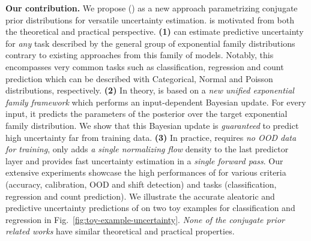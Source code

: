\textbf{Our contribution.} We propose \NatPN{} (\NatPNacro{}) as a new approach parametrizing conjugate prior distributions for versatile uncertainty estimation. \NatPNacro{}{} is motivated from both the theoretical and practical perspective. 
\textbf{(1)} \NatPNacro{} can estimate predictive uncertainty for \emph{any} task described by the general group of exponential family distributions contrary to existing approaches from this family of models. Notably, this encompasses very common tasks such as classification, regression and count prediction which can be described with Categorical, Normal and Poisson distributions, respectively. 
\textbf{(2)} In theory, \NatPNacro{} is based on a \emph{new unified exponential family framework} which performs an input-dependent Bayesian update. For every input, it predicts the parameters of the posterior over the target exponential family distribution. We show that this Bayesian update is \emph{guaranteed} to predict high uncertainty far from training data.
\textbf{(3)} In practice, \NatPNacro{} requires \emph{no OOD data for training}, only adds \emph{a single normalizing flow} density to the last predictor layer and provides fast uncertainty estimation in a \emph{single forward pass}. Our extensive experiments showcase the high performances of \NatPNacro{} for various criteria (accuracy, calibration, OOD and shift detection) and tasks (classification, regression and count prediction). We illustrate the accurate aleatoric and predictive uncertainty predictions of \NatPNacro{} on two toy examples for classification and regression in Fig.~\ref{fig:toy-example-uncertainty}. \emph{None of the conjugate prior related works} have similar theoretical and practical properties.

